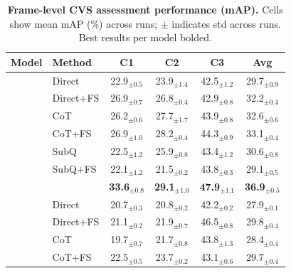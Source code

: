 \begin{table}[t]
\caption{\textbf{Frame-level CVS assessment performance (mAP).} Cells show mean mAP (\%) across runs; $\pm$ indicates std across runs. Best results per model bolded.}
\label{tab:frame_map_main}
\centering
\setlength{\tabcolsep}{6pt}
\renewcommand{\arraystretch}{1.05}
\scriptsize
\begin{tabular}{l l cccc}
\toprule
\textbf{Model} & \textbf{Method} & \textbf{C1} & \textbf{C2} & \textbf{C3} & \textbf{Avg} \\
\midrule

& Direct
& 22.9$_{\pm 0.5}$
& 23.9$_{\pm 1.4}$
& 42.5$_{\pm 1.2}$
& 29.7$_{\pm 0.9}$ \\

& Direct+FS
& 26.9$_{\pm 0.7}$
& 26.8$_{\pm 0.4}$
& 42.9$_{\pm 0.8}$
& 32.2$_{\pm 0.4}$ \\

& CoT
& 26.2$_{\pm 0.6}$
& 27.7$_{\pm 1.7}$
& 43.9$_{\pm 0.8}$
& 32.6$_{\pm 0.6}$ \\

& CoT+FS
& 26.9$_{\pm 1.0}$
& 28.2$_{\pm 0.4}$
& 44.3$_{\pm 0.9}$
& 33.1$_{\pm 0.4}$ \\

& SubQ
& 22.5$_{\pm 1.2}$
& 25.9$_{\pm 0.8}$
& 43.4$_{\pm 1.2}$
& 30.6$_{\pm 0.8}$ \\

& SubQ+FS
& 22.1$_{\pm 1.2}$
& 21.5$_{\pm 0.2}$
& 43.8$_{\pm 0.3}$
& 29.1$_{\pm 0.5}$ \\

& \textbf{\OURS{}}
& \textbf{33.6$_{\pm 0.8}$}
& \textbf{29.1$_{\pm 1.0}$}
& \textbf{47.9$_{\pm 1.1}$}
& \textbf{36.9$_{\pm 0.5}$} \\
\midrule

& Direct
& 20.7$_{\pm 0.3}$
& 20.8$_{\pm 0.2}$
& 42.2$_{\pm 0.2}$
& 27.9$_{\pm 0.1}$ \\

& Direct+FS
& 21.1$_{\pm 0.2}$
& 21.9$_{\pm 0.7}$
& 46.5$_{\pm 0.8}$
& 29.8$_{\pm 0.4}$ \\

& CoT
& 19.7$_{\pm 0.7}$
& 21.7$_{\pm 0.8}$
& 43.8$_{\pm 1.3}$
& 28.4$_{\pm 0.4}$ \\

& CoT+FS
& 22.5$_{\pm 0.5}$
& 23.7$_{\pm 0.2}$
& 43.1$_{\pm 0.6}$
& 29.7$_{\pm 0.4}$ \\


\end{tabular}
\end{table}
